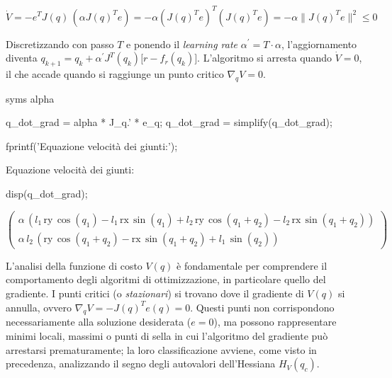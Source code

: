 \documentclass[11pt, a4paper]{article}
\begin{document}
\label{H_9194}
\[
    \dot{V} = -e^T J(q)\,(\alpha J(q)^T e) = -\alpha (J(q)^T e)^T (J(q)^T e) = -\alpha \|J(q)^T e\|^2 \le 0
\]

\begin{par}
\begin{flushleft}
Discretizzando con passo $T$ e ponendo il \textit{learning rate} $\alpha^{\prime } =T\cdot \alpha$, l'aggiornamento diventa $q_{k+1} =q_k +\alpha^{\prime } J^T (q_k )\bigl\lbrack r-f_r (q_k )\bigr\rbrack$. L'algoritmo si arresta quando $\dot{V} =0$, il che accade quando si raggiunge un punto critico $\nabla_q V=0$.
\end{flushleft}
\end{par}

\begin{matlabcode}
syms alpha

q_dot_grad = alpha * J_q.' * e_q;
q_dot_grad = simplify(q_dot_grad);

fprintf('Equazione velocità dei giunti:');
\end{matlabcode}
\begin{matlaboutput}
Equazione velocità dei giunti:
\end{matlaboutput}
\begin{matlabcode}
disp(q_dot_grad);
\end{matlabcode}
\begin{matlabsymbolicoutput}
$\displaystyle \left(\begin{array}{c}
\alpha \,{\left(l_1 \,\textrm{ry}\,\cos \left(q_1 \right)-l_1 \,\textrm{rx}\,\sin \left(q_1 \right)+l_2 \,\textrm{ry}\,\cos \left(q_1 +q_2 \right)-l_2 \,\textrm{rx}\,\sin \left(q_1 +q_2 \right)\right)}\\
\alpha \,l_2 \,{\left(\textrm{ry}\,\cos \left(q_1 +q_2 \right)-\textrm{rx}\,\sin \left(q_1 +q_2 \right)+l_1 \,\sin \left(q_2 \right)\right)}
\end{array}\right)$
\end{matlabsymbolicoutput}

\begin{par}
\begin{flushleft}
L'analisi della funzione di costo $V(q)$ è fondamentale per comprendere il comportamento degli algoritmi di ottimizzazione, in particolare quello del gradiente. I punti critici (o \textit{stazionari}) si trovano dove il gradiente di $V(q)$ si annulla, ovvero $\nabla_q V=-J(q)^T e(q)=0$. Questi punti non corrispondono necessariamente alla soluzione desiderata ($e=0$), ma possono rappresentare minimi locali, massimi o punti di sella in cui l'algoritmo del gradiente può arrestarsi prematuramente; la loro classificazione avviene, come visto in precedenza, analizzando il segno degli autovalori dell'Hessiana $H_V(q_c)$.
\end{flushleft}
\end{par}
\end{document}
